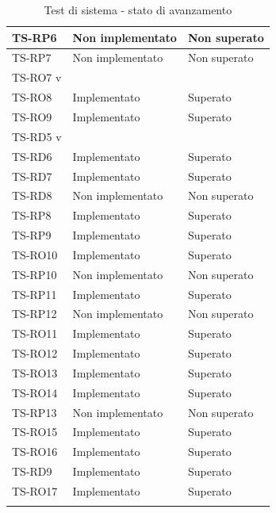 \begin{longtable}{|>{\centering\arraybackslash}m{1.6cm}|>{\centering\arraybackslash}m{6.41cm}|>{\centering\arraybackslash}m{3.1cm}|}
		\rowcolor{LightGray}
		TS-RP6		
		& Non implementato
		& Non superato
		\\ \hline
		\rowcolor{white}
		TS-RP7		
		& Non implementato
		& Non superato
		\\ \hline
		\rowcolor{LightGray}
		TS-RO7		v
		\\ \hline
		\rowcolor{white}
		TS-RO8		
		& Implementato
		& Superato
		\\ \hline
		\rowcolor{LightGray}
		TS-RO9		
		& Implementato
		& Superato
		\\ \hline
		\rowcolor{white}
		TS-RD5		v
		\\ \hline
		\rowcolor{LightGray}
		TS-RD6		
		& Implementato
		& Superato
		\\ \hline
		\rowcolor{white}
		TS-RD7
		& Implementato
		& Superato
		\\ \hline
		\rowcolor{LightGray}
		TS-RD8		
		& Non implementato
		& Non superato
		\\ \hline 
		\rowcolor{white}
		TS-RP8		
		& Implementato
		& Superato		
		\\ \hline
		\rowcolor{LightGray}
		TS-RP9		
		& Implementato
		& Superato
		\\ \hline
		\rowcolor{white}
		TS-RO10
		& Implementato
		& Superato
		\\ \hline
		\rowcolor{LightGray}
		TS-RP10		
		& Non implementato
		& Non superato
		\\ \hline
		\rowcolor{white}
		TS-RP11		
		& Implementato
		& Superato
		\\ \hline
		\rowcolor{LightGray}
		TS-RP12		
		& Non implementato
		& Non superato
		\\ \hline	
		
		\rowcolor{white}
		TS-RO11	
		& Implementato
		& Superato
		\\ \hline
		\rowcolor{LightGray}
		TS-RO12	
		& Implementato
		& Superato
		\\ \hline
		\rowcolor{white}
		TS-RO13
		& Implementato
		& Superato
		\\ \hline
		\rowcolor{LightGray}
		TS-RO14
		& Implementato
		& Superato
		\\ \hline
		\rowcolor{white}
		TS-RP13
		& Non implementato
		& Non superato
		\\ \hline
		\rowcolor{LightGray}
		TS-RO15
		& Implementato
		& Superato
		\\ \hline
		\rowcolor{white}
		TS-RO16	
		& Implementato
		& Superato
		\\ \hline
		\rowcolor{LightGray}
		TS-RD9
		& Implementato
		& Superato
		\\ \hline
		\rowcolor{LightGray}
		TS-RO17
		& Implementato
		& Superato
		\\ \hline
		
		\caption{Test di sistema - stato di avanzamento}
\end{longtable}



